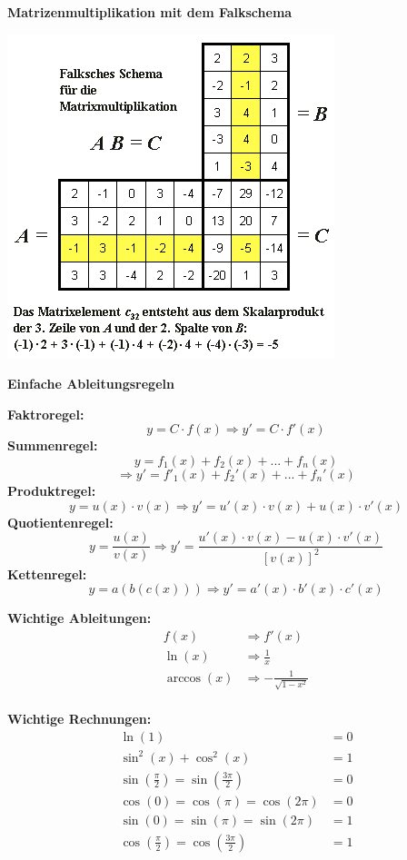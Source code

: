 \documentclass[fontset=ubuntu,12pt,a4paper,fleqn]{article}
\begin{document}
{\Large\textbf{Matrizenmultiplikation mit dem Falkschema}\par}

\setlength{\columnseprule}{0.4pt}
\begin{multicols}{2}

\includegraphics[width=0.7\linewidth]{FalkschesSchema.png}

{\Large\textbf{Einfache Ableitungsregeln}\par}

\textbf{Faktroregel:}
\[
y= C\cdot f(x) \Rightarrow y'= C\cdot f'(x)
\]
\textbf{Summenregel:}
\[
y= f_1(x) + f_2(x) + ... + f_n(x)  
\]\[
\Rightarrow y'=f'_1(x) + f_2'(x) + ... + f_n'(x)
\]
\textbf{Produktregel:}
\[
y= u(x) \cdot v(x) \Rightarrow y'=u'(x) \cdot v(x) + u(x) \cdot v'(x)
\]
\textbf{Quotientenregel:}
\[
y= \frac{u(x)}{v(x)} \Rightarrow y'=\frac{u'(x) \cdot v(x) - u(x) \cdot v'(x)}{[v(x)]^2}
\]
\textbf{Kettenregel:}
\[
y=a(b(c(x))) \Rightarrow y'= a'(x) \cdot b'(x) \cdot c'(x)
\]

\textbf{Wichtige Ableitungen:}
\begin{align*}
	f(x) &\Rightarrow f'(x)\\
	\ln(x) &\Rightarrow \frac{1}{x}\\
	\arccos(x) &\Rightarrow -\frac{1}{\sqrt{1-x^2}}\\
\end{align*}

\textbf{Wichtige Rechnungen:}
\begin{align*}
	\ln(1) &=0\\
	\sin^2(x)+\cos^2(x)&=1\\
	\sin\left(\frac{\pi}{2}\right) = \sin\left(\frac{3\pi}{2}\right) &=0\\
	\cos(0) = \cos(\pi) = \cos(2\pi)&=0\\
	\sin(0) = \sin(\pi) = \sin(2\pi)&=1\\
	\cos\left(\frac{\pi}{2}\right) = \cos\left(\frac{3\pi}{2}\right) &=1\\
\end{align*}
\newpage
\end{multicols}
\end{document}
